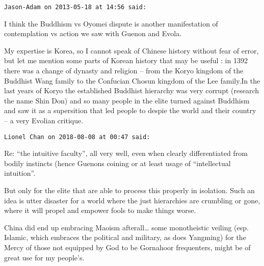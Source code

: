 \begin{footnotesize}
\begin{sffamily}
\hfill

\texttt{Jason-Adam on 2013-05-18 at 14:56 said: }

I think the Buddhism vs Oyomei dispute is another manifestation of contemplation vs action we saw with Guenon and Evola. 

My expertise is Korea, so I cannot speak of Chinese history without fear of error, but let me mention some parts of Korean history that may be useful : in 1392 there was a change of dynasty and religion – from the Koryo kingdom of the Buddhist Wang family to the Confucian Chosun kingdom of the Lee family.In the last years of Koryo the established Buddhist hierarchy was very corrupt (research the name Shin Don) and so many people in the elite turned against Buddhism and saw it as a supersition that led people to despie the world and their country – a very Evolian critique.


\hfill

\texttt{Lionel Chan on 2018-08-08 at 00:47 said: }

Re: “the intuitive faculty”, all very well, even when clearly differentiated from bodily instincts (hence Guenons coining or at least usage of “intellectual intuition”.

But only for the elite that are able to process this properly in isolation. Such an idea is utter disaster for a world where the just hierarchies are crumbling or gone, where it will propel and empower fools to make things worse.

China did end up embracing Maoism afterall… some monotheistic veiling (esp. Islamic, which embraces the political and military, as does Yangming) for the Mercy of those not equipped by God to be Gornahoor frequenters, might be of great use for my people's.


\hfill

\end{sffamily}\end{footnotesize}
